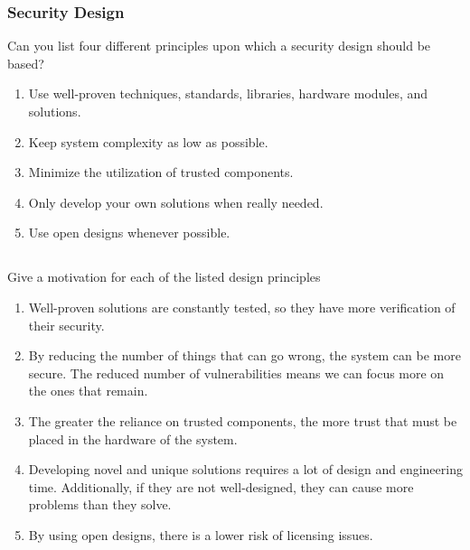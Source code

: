 \section{Security Design}\label{sec:Security_Design}
\begin{questions}
\question{} Can you list four different principles upon which a security design should be based?
  \begin{solution}
    \begin{enumerate}[noitemsep]
    \item Use well-proven techniques, standards, libraries, hardware modules, and solutions.
    \item Keep system complexity as low as possible.
    \item Minimize the utilization of trusted components.
    \item Only develop your own solutions when really needed.
    \item Use open designs whenever possible.
    \end{enumerate}
  \end{solution}

  \begin{parts}
  \part{} Give a motivation for each of the listed design principles
    \begin{solution}
      \begin{enumerate}[noitemsep]
      \item Well-proven solutions are constantly tested, so they have more verification of their security.
      \item By reducing the number of things that can go wrong, the system can be more secure.
        The reduced number of vulnerabilities means we can focus more on the ones that remain.
      \item The greater the reliance on trusted components, the more trust that must be placed in the hardware of the system.
      \item Developing novel and unique solutions requires a lot of design and engineering time. Additionally, if they are not well-designed, they can cause more problems than they solve.
      \item By using open designs, there is a lower risk of licensing issues.
      \end{enumerate}
    \end{solution}
  \end{parts}


\end{questions}
